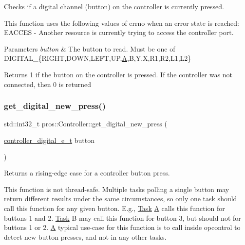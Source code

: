 Checks if a digital channel (button) on the controller is currently pressed. 

This function uses the following values of errno when an error state is reached\+: E\+A\+C\+C\+ES -\/ Another resource is currently trying to access the controller port.


\begin{DoxyParams}{Parameters}
{\em button} & The button to read. Must be one of D\+I\+G\+I\+T\+A\+L\+\_\+\{R\+I\+G\+HT,D\+O\+WN,L\+E\+FT,UP,\mbox{\hyperlink{structA}{A}},B,Y,X,R1,R2,L1,L2\}\\
\hline
\end{DoxyParams}
\begin{DoxyReturn}{Returns}
1 if the button on the controller is pressed. If the controller was not connected, then 0 is returned 
\end{DoxyReturn}
\mbox{\label{classpros_1_1Controller_a9dc7dc6028431d3f8f9aff0fc7a4bed6}} 
\subsubsection{\texorpdfstring{get\_digital\_new\_press()}{get\_digital\_new\_press()}}
{\footnotesize\ttfamily std\+::int32\+\_\+t pros\+::\+Controller\+::get\+\_\+digital\+\_\+new\+\_\+press (\begin{DoxyParamCaption}\item[{\mbox{\hyperlink{misc_8h_a8c380ff02828ee53954bc0ce274253ed}{controller\+\_\+digital\+\_\+e\+\_\+t}}}]{button }\end{DoxyParamCaption})}



Returns a rising-\/edge case for a controller button press. 

This function is not thread-\/safe. Multiple tasks polling a single button may return different results under the same circumstances, so only one task should call this function for any given button. E.\+g., \mbox{\hyperlink{classpros_1_1Task}{Task}} \mbox{\hyperlink{structA}{A}} calls this function for buttons 1 and 2. \mbox{\hyperlink{classpros_1_1Task}{Task}} B may call this function for button 3, but should not for buttons 1 or 2. \mbox{\hyperlink{structA}{A}} typical use-\/case for this function is to call inside opcontrol to detect new button presses, and not in any other tasks.

